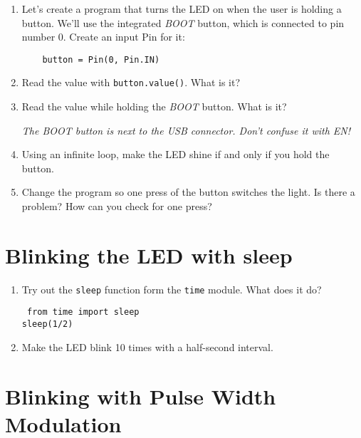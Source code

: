 \documentclass[a4paper,10pt]{article}
\begin{document}
\begin{enumerate}[resume]

\item Let's create a program that turns the LED on when the user is holding a button.
      We'll use the integrated \emph{BOOT} button, which is connected to pin number 0.
      Create an input Pin for it:

      \texttt{~~~~button = Pin(0, Pin.IN)}

\item Read the value with \texttt{button.value()}. What is it?

\item Read the value while holding the \emph{BOOT} button. What is it?

    \textit{
        The \emph{BOOT} button is next to the USB connector.
        Don't confuse it with \emph{EN}!
    }

\item Using an infinite loop, make the LED shine if and only if you hold the button.

\item Change the program so one press of the button switches the light.
      Is there a problem? How can you check for one press?

\end{enumerate}

\section*{Blinking the LED with sleep}

\begin{enumerate}[resume]

\item Try out the \texttt{sleep} function form the \texttt{time} module.
    What does it do?

    \texttt{
        from time import sleep \\
        sleep(1/2)
    }

\item Make the LED blink 10 times with a half-second interval.

\end{enumerate}

\section*{Blinking with Pulse Width Modulation}
\end{document}

